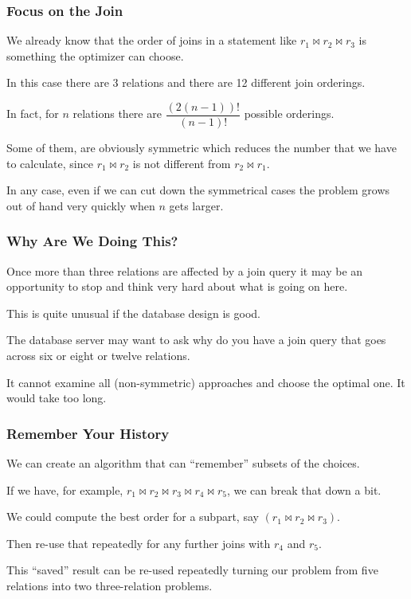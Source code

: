 \begin{frame}
\frametitle{Focus on the Join}

We already know that the order of joins in a statement like $r_{1} \bowtie r_{2} \bowtie r_{3}$ is something the optimizer can choose. 

In this case there are 3 relations and there are 12 different join orderings. 

In fact, for $n$ relations there are $\dfrac{(2(n-1))!}{(n-1)!}$ possible orderings. 

Some of them, are obviously symmetric which reduces the number that we have to calculate, since $r_{1} \bowtie r_{2}$ is not different from $r_{2} \bowtie r_{1}$. 

In any case, even if we can cut down the symmetrical cases the problem grows out of hand very quickly when $n$ gets larger.


\end{frame}


\begin{frame}
\frametitle{Why Are We Doing This?}

Once more than three relations are affected by a join query it may be an opportunity to stop and think very hard about what is going on here. 

This is quite unusual if the database design is good. 

The database server may want to ask why do you have a join query that goes across six or eight or twelve relations. 

It cannot examine all (non-symmetric) approaches and choose the optimal one. It would take too long.

\end{frame}


\begin{frame}
\frametitle{Remember Your History}

We can create an algorithm that can ``remember'' subsets of the choices. 

If we have, for example, $r_{1} \bowtie r_{2} \bowtie r_{3} \bowtie r_{4} \bowtie r_{5}$, we can break that down a bit. 

We could compute the best order for a subpart, say $(r_{1} \bowtie r_{2} \bowtie r_{3})$. 

Then re-use that repeatedly for any further joins with $r_{4}$ and $r_{5}$. 

This ``saved'' result can be re-used repeatedly turning our problem from five relations into two three-relation problems.

\end{frame}

